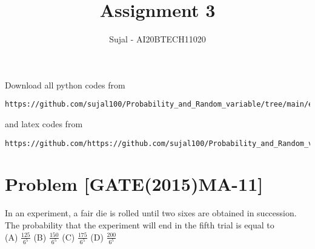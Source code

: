 \documentclass[journal,12pt,twocolumn]{IEEEtran}
\begin{document}
\let\StandardTheFigure\thefigure
\let\vec\mathbf
\renewcommand{\thefigure}{\theproblem}
\def\putbox#1#2#3{\makebox[0in][l]{\makebox[#1][l]{}\raisebox{\baselineskip}[0in][0in]{\raisebox{#2}[0in][0in]{#3}}}}
     \def\rightbox#1{\makebox[0in][r]{#1}}
     \def\centbox#1{\makebox[0in]{#1}}
     \def\topbox#1{\raisebox{-\baselineskip}[0in][0in]{#1}}
     \def\midbox#1{\raisebox{-0.5\baselineskip}[0in][0in]{#1}}
\vspace{3cm}
\title{Assignment 3}
\author{Sujal - AI20BTECH11020}
\maketitle
\newpage
\bigskip
\renewcommand{\thefigure}{\theenumi}
\renewcommand{\thetable}{\theenumi}
Download all python codes from 
\begin{lstlisting}
https://github.com/sujal100/Probability_and_Random_variable/tree/main/exercise_3/codes
\end{lstlisting}

and latex codes from 

\begin{lstlisting}
https://github.com/https://github.com/sujal100/Probability_and_Random_variable/blob/main/exercise_3/exercise_3_main_tex.tex
\end{lstlisting}
\section{Problem [GATE(2015)MA-11]}
In an experiment, a fair die is rolled until two sixes are obtained in succession. The probability that the experiment will end in the fifth trial is equal to\\
(A) $\frac{125}{6^{5}}$
(B) $\frac{150}{6^{5}}$
(C) $\frac{175}{6^{5}}$
(D) $\frac{200}{6^{5}}$
\end{document}
